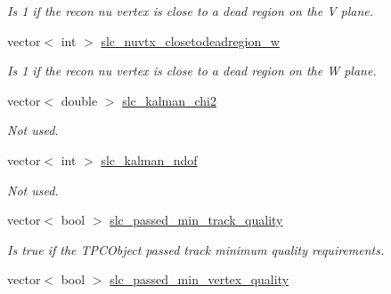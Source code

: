 \begin{DoxyCompactItemize}
\begin{DoxyCompactList}\small\item\em Is 1 if the recon nu vertex is close to a dead region on the V plane. \end{DoxyCompactList}\item 
\hypertarget{classUBXSecEvent_a0e32deb7f9e8d3f4356b52dfa74892ad}{vector$<$ int $>$ \hyperlink{classUBXSecEvent_a0e32deb7f9e8d3f4356b52dfa74892ad}{slc\-\_\-nuvtx\-\_\-closetodeadregion\-\_\-w}}\label{classUBXSecEvent_a0e32deb7f9e8d3f4356b52dfa74892ad}

\begin{DoxyCompactList}\small\item\em Is 1 if the recon nu vertex is close to a dead region on the W plane. \end{DoxyCompactList}\item 
\hypertarget{classUBXSecEvent_a7b3a38020a5ff375b9a9632c6eda9845}{vector$<$ double $>$ \hyperlink{classUBXSecEvent_a7b3a38020a5ff375b9a9632c6eda9845}{slc\-\_\-kalman\-\_\-chi2}}\label{classUBXSecEvent_a7b3a38020a5ff375b9a9632c6eda9845}

\begin{DoxyCompactList}\small\item\em Not used. \end{DoxyCompactList}\item 
\hypertarget{classUBXSecEvent_ac4a8b79e4a4b02254ede89b475f3ca5c}{vector$<$ int $>$ \hyperlink{classUBXSecEvent_ac4a8b79e4a4b02254ede89b475f3ca5c}{slc\-\_\-kalman\-\_\-ndof}}\label{classUBXSecEvent_ac4a8b79e4a4b02254ede89b475f3ca5c}

\begin{DoxyCompactList}\small\item\em Not used. \end{DoxyCompactList}\item 
\hypertarget{classUBXSecEvent_aab3be8887f062f848104113097b27ad5}{vector$<$ bool $>$ \hyperlink{classUBXSecEvent_aab3be8887f062f848104113097b27ad5}{slc\-\_\-passed\-\_\-min\-\_\-track\-\_\-quality}}\label{classUBXSecEvent_aab3be8887f062f848104113097b27ad5}

\begin{DoxyCompactList}\small\item\em Is true if the T\-P\-C\-Object passed track minimum quality requirements. \end{DoxyCompactList}\item 
\hypertarget{classUBXSecEvent_af2bdc55d1c56cea1c4e3104e262f029c}{vector$<$ bool $>$ \hyperlink{classUBXSecEvent_af2bdc55d1c56cea1c4e3104e262f029c}{slc\-\_\-passed\-\_\-min\-\_\-vertex\-\_\-quality}}\label{classUBXSecEvent_af2bdc55d1c56cea1c4e3104e262f029c}


\end{DoxyCompactItemize}
